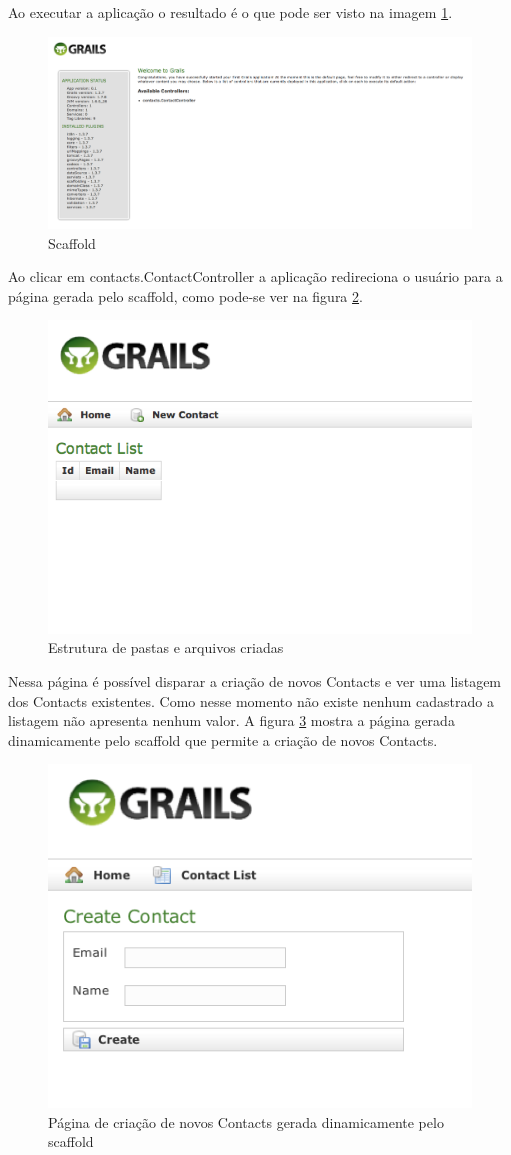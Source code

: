\documentclass[12pt]{article}
\begin{document}
    
    Ao executar a aplicação o resultado é o que pode ser visto na imagem \ref{fig:contactScaffold1}.

    \begin{figure}[h!]
       \centering
       \includegraphics[width=1\textwidth]{images/contactControllerScaffold.png}
       \caption{Scaffold}
       \label{fig:contactScaffold1}
   \end{figure}
   
   Ao clicar em contacts.ContactController a aplicação redireciona o usuário para
   a página gerada pelo scaffold, como pode-se ver na figura \ref{fig:contactScaffold2}.
   
   \begin{figure}[h!]
      \centering
      \includegraphics[width=.4\textwidth]{images/contactControllerScaffold2.png}
      \caption{Estrutura de pastas e arquivos criadas}
      \label{fig:contactScaffold2}
  \end{figure}
  
  Nessa página é possível disparar a criação de novos Contacts e ver uma listagem
  dos Contacts existentes. Como nesse momento não existe nenhum cadastrado a listagem
  não apresenta nenhum valor. A figura \ref{fig:createContactScaffold} mostra a 
  página gerada dinamicamente pelo scaffold que permite a criação de novos Contacts.
  
   \begin{figure}[h!]
      \centering
      \includegraphics[width=.4\textwidth]{images/createContactScaffold.png}
      \caption{Página de criação de novos Contacts gerada dinamicamente pelo scaffold}
      \label{fig:createContactScaffold}
  \end{figure}
  
\end{document}
